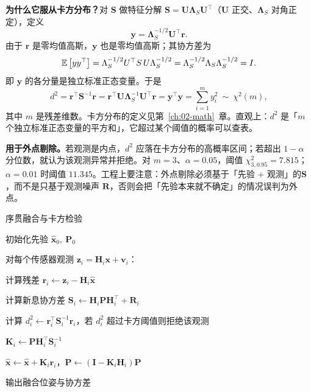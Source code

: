 \textbf{为什么它服从卡方分布？}对 $\bm{S}$ 做特征分解 $\bm{S}=\bm{U}\bm{\Lambda}_S\bm{U}^{\top}$（$\bm{U}$ 正交、$\bm{\Lambda}_S$ 对角正定），定义
\begin{equation}
  \bm{y} = \bm{\Lambda}_S^{-1/2}\bm{U}^{\top}\bm{r}.
\end{equation}
由于 $\bm{r}$ 是零均值高斯，$\bm{y}$ 也是零均值高斯；其协方差为
\begin{equation}
  \mathbb{E}\left[yy^{\top}\right]
  = \Lambda_S^{-1/2}U^{\top}S\,U\Lambda_S^{-1/2}
  = \Lambda_S^{-1/2}\Lambda_S\Lambda_S^{-1/2}=I.
\end{equation}
即 $\bm{y}$ 的各分量是独立标准正态变量。于是
\begin{equation}
  d^{2} = \bm{r}^{\top}\bm{S}^{-1}\bm{r}
  = \bm{r}^{\top}\bm{U}\bm{\Lambda}_S^{-1}\bm{U}^{\top}\bm{r}
  = \bm{y}^{\top}\bm{y} = \sum_{i=1}^{m}y_i^{2}\ \sim\ \chi^{2}(m),
  \label{eq:09-chi2}
\end{equation}
其中 $m$ 是残差维数。卡方分布的定义见第~\ref{ch:02-math}~章。直观上：$d^{2}$ 是「$m$ 个独立标准正态变量的平方和」，它超过某个阈值的概率可以查表。

\textbf{用于外点剔除。}若观测是内点，$d^{2}$ 应落在卡方分布的高概率区间；若超出 $1-\alpha$ 分位数，就认为该观测异常并拒绝。对 $m=3$、$\alpha=0.05$，阈值 $\chi^{2}_{3,0.95}=7.815$；$\alpha=0.01$ 时阈值 $11.345$。工程上要注意：外点剔除必须基于「先验 + 观测」的$\bm{S}$，而不是只基于观测噪声 $\bm{R}$，否则会把「先验本来就不确定」的情况误判为外点。

\begin{pseudo}{序贯融合与卡方检验}
  \item 初始化先验 $\hat{\bm{x}}_0,\ \bm{P}_0$
  \item 对每个传感器观测 $\bm{z}_i=\bm{H}_i\bm{x}+\bm{v}_i$：
  \item \quad 计算残差 $\bm{r}_i\leftarrow\bm{z}_i-\bm{H}_i\hat{\bm{x}}$
  \item \quad 计算新息协方差 $\bm{S}_i\leftarrow\bm{H}_i\bm{P}\bm{H}_i^{\top}+\bm{R}_i$
  \item \quad 计算 $d_i^{2}\leftarrow\bm{r}_i^{\top}\bm{S}_i^{-1}\bm{r}_i$，若 $d_i^{2}$ 超过卡方阈值则拒绝该观测
  \item \quad $\bm{K}_i\leftarrow\bm{P}\bm{H}_i^{\top}\bm{S}_i^{-1}$
  \item \quad $\hat{\bm{x}}\leftarrow\hat{\bm{x}}+\bm{K}_i\bm{r}_i$，$\bm{P}\leftarrow(\bm{I}-\bm{K}_i\bm{H}_i)\bm{P}$
  \item 输出融合位姿与协方差
\end{pseudo}

